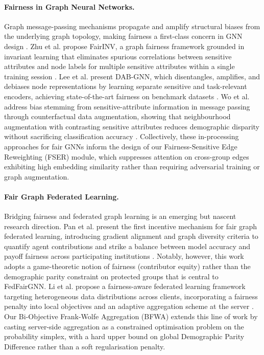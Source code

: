 \documentclass[pmlr]{jmlr}%
\begin{document}
\paragraph{Fairness in Graph Neural Networks.} Graph message-passing mechanisms propagate and amplify structural biases from the underlying graph topology, making fairness a first-class concern in GNN design \citep{lee2025dabgnn}. Zhu et al. propose FairINV, a graph fairness framework grounded in invariant learning that eliminates spurious correlations between sensitive attributes and node labels for multiple sensitive attributes within a single training session \citep{zhu2024fairinv}. Lee et al. present DAB-GNN, which disentangles, amplifies, and debiases node representations by learning separate sensitive and task-relevant encoders, achieving state-of-the-art fairness on benchmark datasets \citep{lee2025dabgnn}. Wo et al. address bias stemming from sensitive-attribute information in message passing through counterfactual data augmentation, showing that neighbourhood augmentation with contrasting sensitive attributes reduces demographic disparity without sacrificing classification accuracy \citep{wo2025counterfactual}. Collectively, these in-processing approaches for fair GNNs inform the design of our Fairness-Sensitive Edge Reweighting (FSER) module, which suppresses attention on cross-group edges exhibiting high embedding similarity rather than requiring adversarial training or graph augmentation.

\paragraph{Fair Graph Federated Learning.} Bridging fairness and federated graph learning is an emerging but nascent research direction. Pan et al. present the first incentive mechanism for fair graph federated learning, introducing gradient alignment and graph diversity criteria to quantify agent contributions and strike a balance between model accuracy and payoff fairness across participating institutions \citep{pan2024incentivefairgraphfl}. Notably, however, this work adopts a game-theoretic notion of fairness (contributor equity) rather than the demographic parity constraint on protected groups that is central to FedFairGNN. Li et al. propose a fairness-aware federated learning framework targeting heterogeneous data distributions across clients, incorporating a fairness penalty into local objectives and an adaptive aggregation scheme at the server \citep{li2024fairhetero}. Our Bi-Objective Frank-Wolfe Aggregation (BFWA) extends this line of work by casting server-side aggregation as a constrained optimisation problem on the probability simplex, with a hard upper bound on global Demographic Parity Difference rather than a soft regularisation penalty.
\end{document}
